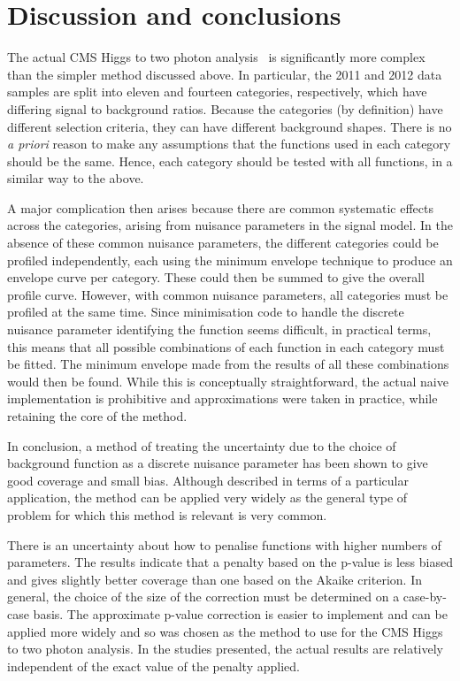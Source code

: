\section{Discussion and conclusions} %
\label{sec:conclusions}
The actual CMS
Higgs to two photon analysis~\cite{ref:introduction:legacy}
is significantly more
complex than the simpler method discussed above. In particular, the 2011
and 2012 data
samples are split into eleven and fourteen categories, respectively, which have
differing signal to background ratios.
Because the categories (by definition) have different selection criteria,
they can have different background shapes.
There is no {\it a priori} reason to make any assumptions that the functions
used in each category should be the same. Hence, each category should be
tested with all functions, in a similar way to the above.

A major complication then arises because there are common systematic effects
across the categories, arising from nuisance parameters in the signal
model.
In the absence of these common nuisance parameters,
the different categories could be profiled independently, each using the
minimum envelope technique to produce an envelope curve per category.
These could then
be summed to give the overall profile curve. However, with common
nuisance parameters, all categories must be profiled at the same time.
Since minimisation code to handle the
discrete nuisance parameter identifying the
function seems difficult, in practical terms, this means that all possible
combinations of each function in each category must be fitted.
The minimum envelope made from the results of all these combinations would
then be found. While this is conceptually straightforward, the actual
naive implementation is prohibitive and approximations were taken in practice,
while retaining the core of the method.

In conclusion,
a method of treating the uncertainty due to the choice of background function
as a discrete nuisance parameter has been shown to give good coverage and
small %
bias.
Although described in terms of a particular application, the method can be
applied very widely as the general type of problem for which this method
is relevant is very common.

There is an uncertainty about how to penalise functions with higher numbers
of parameters. The results indicate that a penalty based on the p-value
is less biased and gives slightly better coverage than one based on the
Akaike criterion. In general, the choice of the size of the correction must be determined
on a case-by-case basis. The approximate p-value correction is easier to implement and
can be applied more widely and so was chosen as the method to use for the CMS Higgs to
two photon analysis.
In the studies presented, the actual results are relatively independent of the exact value of the penalty
applied.


